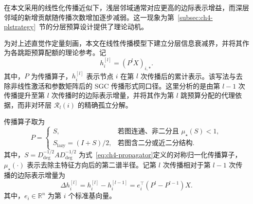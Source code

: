 \label{lem:ch4-decay}\label{idx:theme:infodecay}
在本文采用的线性化传播近似下，浅层邻域通常对应更高的边际表示增益，而深层邻域的新增贡献随传播次数增加逐步减弱。这一现象为第~\ref{subsec:ch4-plstrategy}~节的分层预算设计提供了理论动机。

为对上述直觉作定量刻画，本文在线性传播模型下建立分层信息衰减界，并将其作为各跳距预算配额的理论参考。记
\begin{equation}
  h_i^{[l]} = (P^l X)_{i,*}.
  \label{eq:ch4-linear-propagation}
\end{equation}
其中，\(P\) 为传播算子，\(h_i^{[l]}\) 表示节点 \(i\) 在第 \(l\) 次传播后的累计表示。该写法与去除非线性激活和参数矩阵后的 SGC 传播形式同口径\cite{Wu2019SGC}。这里分析的是由第 \(l-1\) 次传播提升至第 \(l\) 次传播时的边际表示增量，并将其作为第 \(l\) 跳预算分配的代理依据，而非对环层 \(\mathcal{R}_l(i)\) 的精确孤立分解。

传播算子取为
\begin{equation}
  P =
  \begin{cases}
    S, & \text{若图连通、非二分且 } \mu_\star(S) < 1, \\[4pt]
    S_{\mathrm{lazy}} = (I+S)/2, & \text{若图含二分或近二分结构}.
  \end{cases}
  \label{eq:ch4-propagator-choice}
\end{equation}
其中，\(S=D_{\deg}^{-1/2}AD_{\deg}^{-1/2}\) 为式~\eqref{eq:ch4-propagator}定义的对称归一化传播算子，\(\mu_\star(\cdot)\) 表示去除主特征方向后的第二谱半径。记第 \(l\) 次传播相对于第 \(l-1\) 次传播的边际表示增量为
\begin{equation}
  \Delta h_i^{[l]}
  = h_i^{[l]} - h_i^{[l-1]}
  = e_i^\top (P^l - P^{l-1})X.
  \label{eq:ch4-deltah}
\end{equation}
其中，\(e_i\in\mathbb{R}^n\) 为第 \(i\) 个标准基向量。


